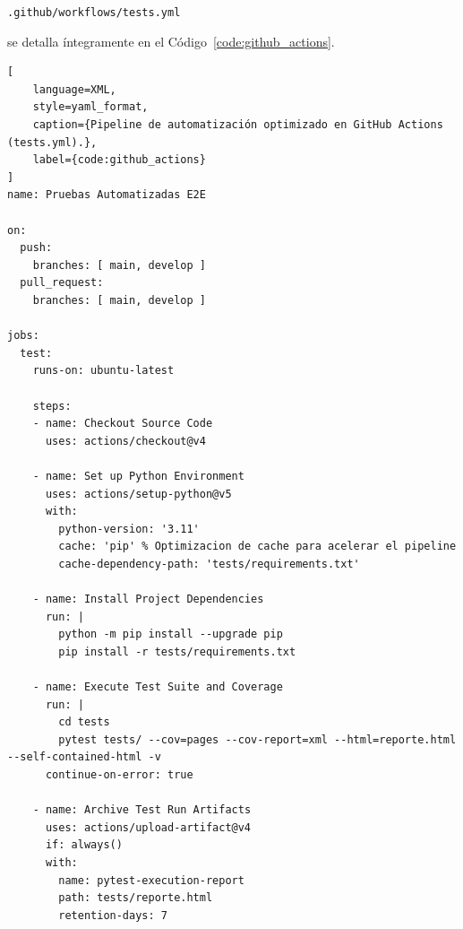 \documentclass[12pt,letterpaper]{article}
\begin{document}
\begin{center}
    \texttt{.github/workflows/tests.yml}
\end{center}

se detalla íntegramente en el Código~\ref{code:github_actions}.

\begin{lstlisting}[
    language=XML,
    style=yaml_format,
    caption={Pipeline de automatización optimizado en GitHub Actions (tests.yml).},
    label={code:github_actions}
]
name: Pruebas Automatizadas E2E

on:
  push:
    branches: [ main, develop ]
  pull_request:
    branches: [ main, develop ]

jobs:
  test:
    runs-on: ubuntu-latest
    
    steps:
    - name: Checkout Source Code
      uses: actions/checkout@v4

    - name: Set up Python Environment
      uses: actions/setup-python@v5
      with:
        python-version: '3.11'
        cache: 'pip' % Optimizacion de cache para acelerar el pipeline
        cache-dependency-path: 'tests/requirements.txt'

    - name: Install Project Dependencies
      run: |
        python -m pip install --upgrade pip
        pip install -r tests/requirements.txt

    - name: Execute Test Suite and Coverage
      run: |
        cd tests
        pytest tests/ --cov=pages --cov-report=xml --html=reporte.html --self-contained-html -v
      continue-on-error: true

    - name: Archive Test Run Artifacts
      uses: actions/upload-artifact@v4
      if: always()
      with:
        name: pytest-execution-report
        path: tests/reporte.html
        retention-days: 7
\end{lstlisting}
\end{document}
